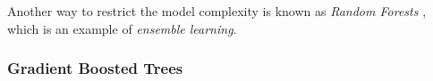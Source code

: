 





Another way to restrict the model complexity is known as \emph{Random Forests} \citep{breiman2001}, which is an example of \emph{ensemble learning}.




\subsubsection{Gradient Boosted Trees}


%